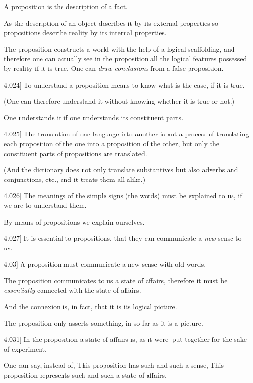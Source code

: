 \documentclass[12pt,oneside]{book}[2007/10/19]
\newcommand{\PropositionE}[2]{%
  \item[\phantomsection\label{PropE:#1}\PropGRef{#1}] #2%
}
\newcommand{\PropGRef}[1]{\hyperref[PropG:#1]{#1}}
\begin{document}
\begin{propositions}
{A proposition is the description of a fact.

As the description of an object describes it by
its external properties so propositions describe
reality by its internal properties.

The proposition constructs a world with the
help of a logical scaffolding, and therefore one
can actually see in the proposition all the logical
features possessed by reality if it is true. One can
\emph{draw conclusions} from a false proposition.}


\PropositionE{4.024}
{To understand a proposition means to know
what is the case, if it is true.

(One can therefore understand it without
knowing whether it is true or not.)

One understands it if one understands its
constituent parts.}


\PropositionE{4.025}
{The translation of one language into another
is not a process of translating each proposition
of the one into a proposition of the other, but
only the constituent parts of propositions are
translated.

(And the dictionary does not only translate
substantives but also adverbs and conjunctions,
etc., and it treats them all alike.)}


\PropositionE{4.026}
{The meanings of the simple signs (the words)
must be explained to us, if we are to understand
them.

By means of propositions we explain ourselves.}


\PropositionE{4.027}
{It is essential to propositions, that they can
communicate a \emph{new} sense to us.}


\PropositionE{4.03}
{A proposition must communicate a new sense
with old words.

The proposition communicates to us a state of
affairs, therefore it must be \emph{essentially} connected
with the state of affairs.

And the connexion is, in fact, that it is its
logical picture.

The proposition only asserts something, in so
far as it is a picture.}


\PropositionE{4.031}
{In the proposition a state of affairs is, as it
were, put together for the sake of experiment.

One can say, instead of, This proposition has
such and such a sense, This proposition represents
such and such a state of affairs.}



\end{propositions}
\end{document}
